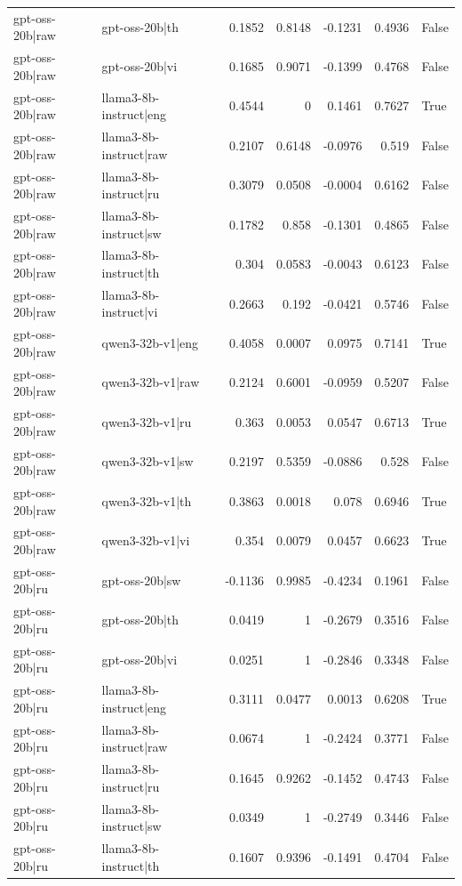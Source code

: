 \begin{table}
\begin{tabular}{l l r r r r l}
gpt-oss-20b|raw & gpt-oss-20b|th & 0.1852 & 0.8148 & -0.1231 & 0.4936 & False \\
gpt-oss-20b|raw & gpt-oss-20b|vi & 0.1685 & 0.9071 & -0.1399 & 0.4768 & False \\
gpt-oss-20b|raw & llama3-8b-instruct|eng & 0.4544 & 0 & 0.1461 & 0.7627 & True \\
gpt-oss-20b|raw & llama3-8b-instruct|raw & 0.2107 & 0.6148 & -0.0976 & 0.519 & False \\
gpt-oss-20b|raw & llama3-8b-instruct|ru & 0.3079 & 0.0508 & -0.0004 & 0.6162 & False \\
gpt-oss-20b|raw & llama3-8b-instruct|sw & 0.1782 & 0.858 & -0.1301 & 0.4865 & False \\
gpt-oss-20b|raw & llama3-8b-instruct|th & 0.304 & 0.0583 & -0.0043 & 0.6123 & False \\
gpt-oss-20b|raw & llama3-8b-instruct|vi & 0.2663 & 0.192 & -0.0421 & 0.5746 & False \\
gpt-oss-20b|raw & qwen3-32b-v1|eng & 0.4058 & 0.0007 & 0.0975 & 0.7141 & True \\
gpt-oss-20b|raw & qwen3-32b-v1|raw & 0.2124 & 0.6001 & -0.0959 & 0.5207 & False \\
gpt-oss-20b|raw & qwen3-32b-v1|ru & 0.363 & 0.0053 & 0.0547 & 0.6713 & True \\
gpt-oss-20b|raw & qwen3-32b-v1|sw & 0.2197 & 0.5359 & -0.0886 & 0.528 & False \\
gpt-oss-20b|raw & qwen3-32b-v1|th & 0.3863 & 0.0018 & 0.078 & 0.6946 & True \\
gpt-oss-20b|raw & qwen3-32b-v1|vi & 0.354 & 0.0079 & 0.0457 & 0.6623 & True \\
gpt-oss-20b|ru & gpt-oss-20b|sw & -0.1136 & 0.9985 & -0.4234 & 0.1961 & False \\
gpt-oss-20b|ru & gpt-oss-20b|th & 0.0419 & 1 & -0.2679 & 0.3516 & False \\
gpt-oss-20b|ru & gpt-oss-20b|vi & 0.0251 & 1 & -0.2846 & 0.3348 & False \\
gpt-oss-20b|ru & llama3-8b-instruct|eng & 0.3111 & 0.0477 & 0.0013 & 0.6208 & True \\
gpt-oss-20b|ru & llama3-8b-instruct|raw & 0.0674 & 1 & -0.2424 & 0.3771 & False \\
gpt-oss-20b|ru & llama3-8b-instruct|ru & 0.1645 & 0.9262 & -0.1452 & 0.4743 & False \\
gpt-oss-20b|ru & llama3-8b-instruct|sw & 0.0349 & 1 & -0.2749 & 0.3446 & False \\
gpt-oss-20b|ru & llama3-8b-instruct|th & 0.1607 & 0.9396 & -0.1491 & 0.4704 & False \\

\end{tabular}
\end{table}
